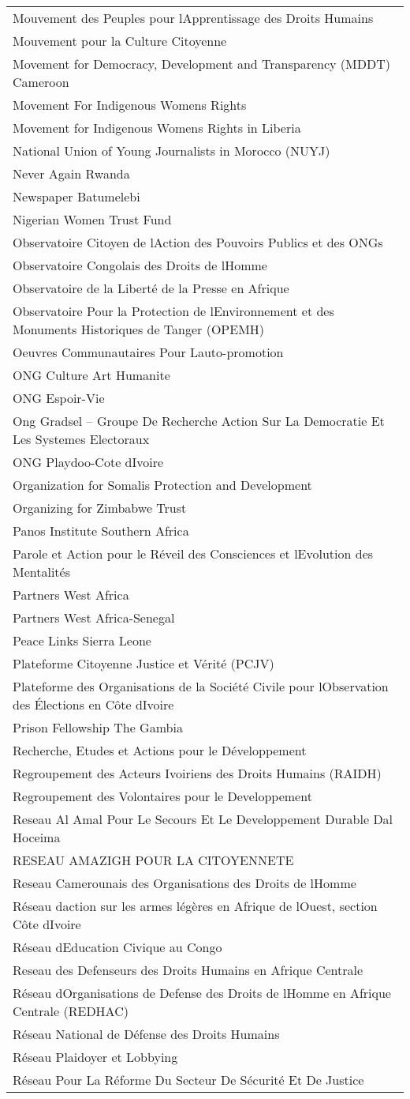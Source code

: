 \begin{longtable}[]{@{}l@{}}
Mouvement des Peuples pour lApprentissage des Droits
Humains\tabularnewline
Mouvement pour la Culture Citoyenne\tabularnewline
Movement for Democracy, Development and Transparency (MDDT)
Cameroon\tabularnewline
Movement For Indigenous Womens Rights\tabularnewline
Movement for Indigenous Womens Rights in Liberia\tabularnewline
National Union of Young Journalists in Morocco (NUYJ)\tabularnewline
Never Again Rwanda\tabularnewline
Newspaper Batumelebi\tabularnewline
Nigerian Women Trust Fund\tabularnewline
Observatoire Citoyen de lAction des Pouvoirs Publics et des
ONGs\tabularnewline
Observatoire Congolais des Droits de lHomme\tabularnewline
Observatoire de la Liberté de la Presse en Afrique\tabularnewline
Observatoire Pour la Protection de lEnvironnement et des Monuments
Historiques de Tanger (OPEMH)\tabularnewline
Oeuvres Communautaires Pour Lauto-promotion\tabularnewline
ONG Culture Art Humanite\tabularnewline
ONG Espoir-Vie\tabularnewline
Ong Gradsel -- Groupe De Recherche Action Sur La Democratie Et Les
Systemes Electoraux\tabularnewline
ONG Playdoo-Cote dIvoire\tabularnewline
Organization for Somalis Protection and Development\tabularnewline
Organizing for Zimbabwe Trust\tabularnewline
Panos Institute Southern Africa\tabularnewline
Parole et Action pour le Réveil des Consciences et lEvolution des
Mentalités\tabularnewline
Partners West Africa\tabularnewline
Partners West Africa-Senegal\tabularnewline
Peace Links Sierra Leone\tabularnewline
Plateforme Citoyenne Justice et Vérité (PCJV)\tabularnewline
Plateforme des Organisations de la Société Civile pour lObservation des
Élections en Côte dIvoire\tabularnewline
Prison Fellowship The Gambia\tabularnewline
Recherche, Etudes et Actions pour le Développement\tabularnewline
Regroupement des Acteurs Ivoiriens des Droits Humains
(RAIDH)\tabularnewline
Regroupement des Volontaires pour le Developpement\tabularnewline
Reseau Al Amal Pour Le Secours Et Le Developpement Durable Dal
Hoceima\tabularnewline
RESEAU AMAZIGH POUR LA CITOYENNETE\tabularnewline
Reseau Camerounais des Organisations des Droits de lHomme\tabularnewline
Réseau daction sur les armes légères en Afrique de lOuest, section Côte
dIvoire\tabularnewline
Réseau dEducation Civique au Congo\tabularnewline
Reseau des Defenseurs des Droits Humains en Afrique
Centrale\tabularnewline
Réseau dOrganisations de Defense des Droits de lHomme en Afrique
Centrale (REDHAC)\tabularnewline
Réseau National de Défense des Droits Humains\tabularnewline
Réseau Plaidoyer et Lobbying\tabularnewline
Réseau Pour La Réforme Du Secteur De Sécurité Et De
Justice\tabularnewline

\end{longtable}
